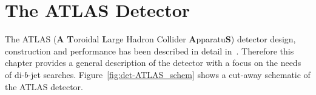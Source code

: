 

\section{The ATLAS Detector}
\label{sec:det-ATLAS}

The ATLAS (\textbf{A} \textbf{T}oroidal \textbf{L}arge Hadron Collider \textbf{A}pparatu\textbf{S}) detector
design, construction and performance has been described in detail in~\cite{det-ATLAS_Exp, det-ATLAS_TDR, det-ATLAS_Perf}.
Therefore this chapter provides a general description of the detector with a focus on the needs of di-$b$-jet searches.
Figure~\ref{fig:det-ATLAS_schem} shows a cut-away schematic of the ATLAS detector.

